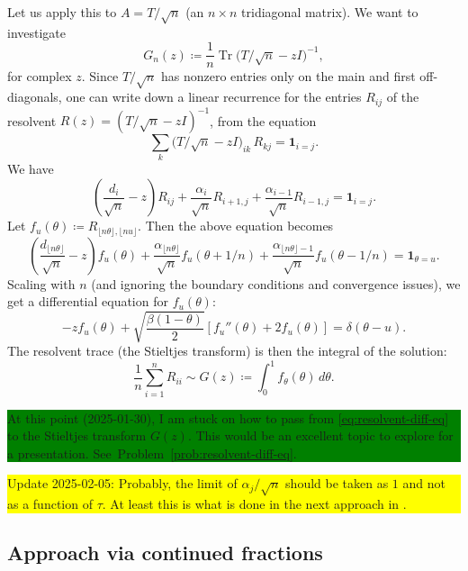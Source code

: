 \documentclass[letterpaper,11pt,oneside,reqno]{article}
\numberwithin{equation}{section}
\theoremstyle{definition}
\begin{document}
Let us apply this to \(A = T/\sqrt{n}\) (an $n\times n$ tridiagonal matrix).  We want
to investigate
\[
	G_n(z)\coloneqq \frac{1}{n}
	\operatorname{Tr}
  \bigl(T/\sqrt{n} - zI\bigr)^{-1},
\]
for complex \(z\).
 Since $T/\sqrt{n}$ has nonzero entries only on the main and first off-diagonals, one can write down a linear recurrence for the entries
$R_{ij}$
of the resolvent
$R(z)=(T/\sqrt{n}-z I)^{-1}$,
from the equation
\[
	\sum_{k}
	\bigl(T/\sqrt{n} - zI\bigr)_{ik}\,R_{kj}
  =
	\mathbf{1}_{i=j}.
\]
We have
\begin{equation*}
	\left(\frac{d_i}{\sqrt{n}}-z\right)R_{ij}
	+
	\frac{\alpha_i}{\sqrt{n}}R_{i+1,j}
	+
	\frac{\alpha_{i-1}}{\sqrt{n}}R_{i-1,j}=
	\mathbf{1}_{i=j}.
\end{equation*}
Let $f_u(\theta)\coloneqq R_{\lfloor n\theta \rfloor ,\lfloor nu \rfloor }$.
Then the above equation becomes
\begin{equation*}
	\left(\frac{d_{\lfloor n\theta \rfloor }}{\sqrt{n}}-z\right)f_u(\theta)
	+
	\frac{\alpha_{\lfloor n\theta \rfloor }}{\sqrt{n}}f_u(\theta+1/n)
	+
	\frac{\alpha_{\lfloor n \theta \rfloor -1}}{\sqrt{n}}f_u(\theta-1/n)=
	\mathbf{1}_{\theta=u}.
\end{equation*}
Scaling with $n$ (and ignoring the boundary conditions and convergence issues), we get
a differential equation for $f_u(\theta)$:
\begin{equation}
	\label{eq:resolvent-diff-eq}
	-z f_u(\theta)+\sqrt{\frac{\beta(1-\theta)}{2}}
	\left[f_u''(\theta)+2f_u(\theta)\right]=\delta(\theta-u).
\end{equation}
The resolvent trace (the Stieltjes transform)
is then the integral of the solution:
\begin{equation*}
	\frac{1}{n}\sum_{i=1}^{n}R_{ii}
	\sim
	G(z)\coloneqq
	\int_0^1 f_\theta(\theta)\,d\theta.
\end{equation*}

\colorbox{green}{\parbox{.7\textwidth}{At this point (2025-01-30), I am stuck on how to pass from
\eqref{eq:resolvent-diff-eq} to the Stieltjes transform $G(z)$.
This would be an excellent topic to explore for a presentation.
See~Problem~\ref{prob:resolvent-diff-eq}.}}

\colorbox{yellow}{\parbox{.7\textwidth}{Update 2025-02-05: Probably,
the limit of $\alpha_j/\sqrt n$ should be taken as $1$ and not as a function of $\tau$.
At least this is what is done in the next approach in .}}


\subsection{Approach via continued fractions}
\label{sub:continued-fractions}
\end{document}
